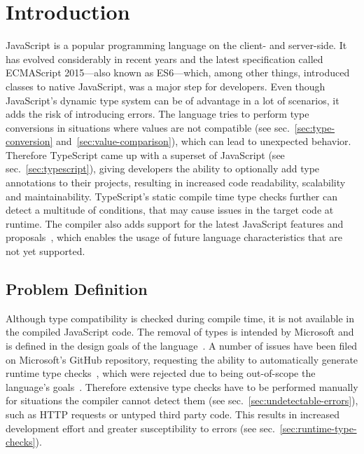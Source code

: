 \chapter{Introduction}
\label{cha:introduction}

JavaScript is a popular programming language on the client- and server-side. It has evolved considerably in recent years and the latest specification called ECMAScript 2015---also known as ES6---which, among other things, introduced classes to native JavaScript, was a major step for developers. Even though JavaScript's dynamic type system can be of advantage in a lot of scenarios, it adds the risk of introducing errors. The language tries to perform type conversions in situations where values are not compatible (see sec.~\ref{sec:type-conversion} and~\ref{sec:value-comparison}), which can lead to unexpected behavior. Therefore TypeScript came up with a superset of JavaScript (see sec.~\ref{sec:typescript}), giving developers the ability to optionally add type annotations to their projects, resulting in increased code readability, scalability and maintainability. TypeScript's static compile time type checks further can detect a multitude of conditions, that may cause issues in the target code at runtime. The compiler also adds support for the latest JavaScript features and proposals~\cites{TypeScriptHandbook:CompilerOptions, TypeScriptWebsite}, which enables the usage of future language characteristics that are not yet supported.


\section{Problem Definition}
\label{sec:problem-definition}

Although type compatibility is checked during compile time, it is not available in the compiled JavaScript code. The removal of types is intended by Microsoft and is defined in the design goals of the language~\cite{TypeScriptWiki:DesignGoals}. A number of issues have been filed on Microsoft's GitHub repository, requesting the ability to automatically generate runtime type checks~\cites{TypeScriptIssue:RuntimeTypeChecking, TypeScriptIssue:RuntimeTypeChecks, TypeScriptIssue:EmitTypeArguments}, which were rejected due to being out-of-scope the language's goals~\cites{TypeScriptIssue:RuntimeTypeChecking:Comment:OutOfScope, TypeScriptIssue:EmitTypeArguments:Comment:OutOfScope}. Therefore extensive type checks have to be performed manually for situations the compiler cannot detect them (see sec.~\ref{sec:undetectable-errors}), such as HTTP requests or untyped third party code. This results in increased development effort and greater susceptibility to errors (see sec.~\ref{sec:runtime-type-checks}).

